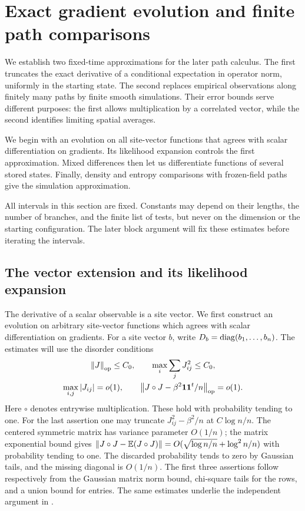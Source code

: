 \section{Exact gradient evolution and finite path comparisons}
\label{sec:gradient-path}

We establish two fixed-time approximations for the later path calculus.
The first truncates the exact derivative of a conditional expectation
in operator norm, uniformly in the starting state.  The second replaces
empirical observations along finitely many paths by finite smooth
simulations.  Their error bounds serve different purposes: the first
allows multiplication by a correlated vector, while the second
identifies limiting spatial averages.

We begin with an evolution on all site-vector functions that agrees
with scalar differentiation on gradients.  Its likelihood expansion
controls the first approximation.  Mixed differences then let us
differentiate functions of several stored states.  Finally, density
and entropy comparisons with frozen-field paths give the simulation
approximation.

All intervals in this section are fixed.  Constants may depend on their
lengths, the number of branches, and the finite list of tests, but never
on the dimension or the starting configuration.  The later block
argument will fix these estimates before iterating the intervals.

\subsection{The vector extension and its likelihood expansion}

The derivative of a scalar observable is a site vector.  We first
construct an evolution on arbitrary site-vector functions which agrees
with scalar differentiation on gradients.  For a site vector $b$, write
$D_b=\operatorname{diag}(b_1,\ldots,b_n)$.  The estimates will use the disorder conditions
\begin{equation}
 \begin{gathered}
 \left\lVert J\right\rVert_{\mathrm{op}}\le C_0,\qquad
 \max_i\sum_jJ_{ij}^2\le C_0,\\
 \max_{i,j}|J_{ij}|=o(1),\qquad
 \left\lVert J\circ J-\beta^2\mathbf 1\mathbf 1^t/n\right\rVert_{\mathrm{op}}=o(1).
 \end{gathered}
 \label{eq:path-disorder}
\end{equation}
Here $\circ$ denotes entrywise multiplication.  These hold with
probability tending to one.  For the last assertion one may truncate
$J_{ij}^2-\beta^2/n$ at $C\log n/n$.  The centered symmetric matrix has
variance parameter $O(1/n)$; the matrix exponential bound gives
$\left\lVert J\circ J-\mathbb E(J\circ J)\right\rVert=O(\sqrt{\log n/n}+\log^2n/n)$
with probability tending to one.  The discarded probability tends to
zero by Gaussian tails, and the missing diagonal is $O(1/n)$.
The first three assertions follow respectively from the Gaussian matrix
norm bound, chi-square tails for the rows, and a union bound for entries.
The same estimates underlie the independent argument in
.

